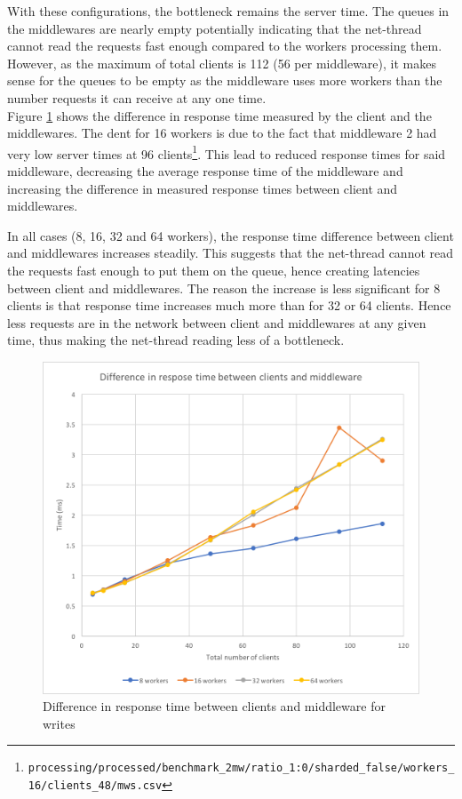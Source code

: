 \documentclass[11pt,a4paper]{article}
\begin{document}
With these configurations, the bottleneck remains the server time. The queues in the middlewares are nearly empty potentially indicating that the net-thread cannot read the requests fast enough compared to the workers processing them. However, as the maximum of total clients is 112 (56 per middleware), it makes sense for the queues to be empty as the middleware uses more workers than the number requests it can receive at any one time.\\
Figure \ref{png::bench_2mw_netlat_writes} shows the difference in response time measured by the client and the middlewares. The dent for 16 workers is due to the fact that middleware 2 had very low server times at 96 clients\footnote{\texttt{processing/processed/benchmark_2mw/ratio_1:0/sharded_false/workers_16/clients_48/mws.csv}}. This lead to reduced response times for said middleware, decreasing the average response time of the middleware and increasing the difference in measured response times between client and middlewares.

In all cases (8, 16, 32 and 64 workers), the response time difference between client and middlewares increases steadily. This suggests that the net-thread cannot read the requests fast enough to put them on the queue, hence creating latencies between client and middlewares. The reason the increase is less significant for 8 clients is that response time increases much more than for 32 or 64 clients. Hence less requests are in the network between client and middlewares at any given time, thus making the net-thread reading less of a bottleneck.

\begin{figure}[!h]
    \centering
    \includegraphics[width=.45\textwidth]{processing/graphics/bench_2mw_netlat_writes.png}
    \caption{Difference in response time between clients and middleware for writes}
    \label{png::bench_2mw_netlat_writes}
\end{figure}
\end{document}
